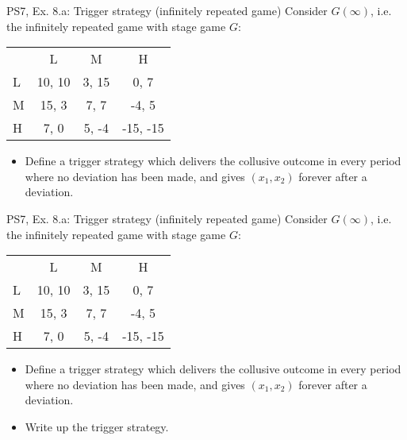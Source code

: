 \begin{frame}{PS7, Ex. 8.a: Trigger strategy (infinitely repeated game)}
    Consider $G(\infty)$, i.e. the infinitely repeated game with stage game $G$: \vspace{-6pt}
    \begin{table}
      \begin{tabular}{l|c|c|c|}
        \multicolumn{1}{c}{} & \multicolumn{1}{c}{L} & \multicolumn{1}{c}{M} & \multicolumn{1}{c}{H} \\\cline{2-4}
        L & 10, 10 & 3, 15 & 0, 7 \\\cline{2-4}
        M & 15, 3 & 7, 7 & -4, 5 \\\cline{2-4}
        H & 7, 0 & 5, -4 & -15, -15 \\\cline{2-4}
      \end{tabular}
    \end{table}
    \begin{itemize}
      \item[(a)] Define a trigger strategy which delivers the collusive outcome in every period where no deviation has been made, and gives $(x_1, x_2)$ forever after a deviation.
    \end{itemize}
    \vfill\null
\end{frame}
\begin{frame}{PS7, Ex. 8.a: Trigger strategy (infinitely repeated game)}
    Consider $G(\infty)$, i.e. the infinitely repeated game with stage game $G$: \vspace{-6pt}
    \begin{table}
      \begin{tabular}{l|c|c|c|}
        \multicolumn{1}{c}{} & \multicolumn{1}{c}{L} & \multicolumn{1}{c}{M} & \multicolumn{1}{c}{H} \\\cline{2-4}
        L & 10, 10 & 3, 15 & 0, 7 \\\cline{2-4}
        M & 15, 3 & 7, 7 & -4, 5 \\\cline{2-4}
        H & 7, 0 & 5, -4 & -15, -15 \\\cline{2-4}
      \end{tabular}
    \end{table}
    \begin{itemize}
      \item[(a)] Define a trigger strategy which delivers the collusive outcome in every period where no deviation has been made, and gives $(x_1, x_2)$ forever after a deviation.
    \end{itemize}
    \begin{multicols}{2}
      \begin{itemize}
        \item[(Step a)] Write up the trigger strategy.
      \end{itemize}
      \vfill\null\columnbreak
      \vfill\null
    \end{multicols}
\end{frame}
